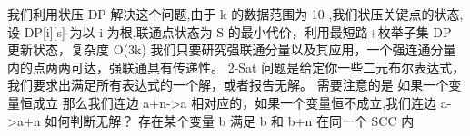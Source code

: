{}我们利用状压\markdownRendererDollarSign{} DP \markdownRendererDollarSign{}解决这个问题,由于\markdownRendererDollarSign{} k\markdownRendererSoftLineBreak
{}\markdownRendererDollarSign{}的数据范围为\markdownRendererDollarSign{} 10 \markdownRendererDollarSign{},我们状压关键点的状态,设\markdownRendererDollarSign{} DP[i][s] \markdownRendererDollarSign{}为以\markdownRendererDollarSign{} i\markdownRendererParagraphSeparator
{} \markdownRendererDollarSign{}为根,联通点状态为\markdownRendererDollarSign{} S\markdownRendererSoftLineBreak
{}\markdownRendererDollarSign{}的最小代价，利用最短路+枚举子集\markdownRendererDollarSign{} DP \markdownRendererDollarSign{}更新状态，复杂度\markdownRendererDollarSign{} O(3\markdownRendererCircumflex{}k) \markdownRendererDollarSign{}\markdownRendererInterblockSeparator
{}\markdownRendererInterblockSeparator
{}
\markdownRendererSectionEnd 
\markdownRendererSectionEnd \markdownRendererSectionBegin
{}\markdownRendererInterblockSeparator
{}\markdownRendererSectionBegin
{}\markdownRendererInterblockSeparator
{}我们只要研究强联通分量以及其应用，一个强连通分量内的点两两可达，强联通具有传递性。\markdownRendererInterblockSeparator
{}\markdownRendererSectionBegin
{}\markdownRendererInterblockSeparator
{}\markdownRendererInterblockSeparator
{}
\markdownRendererSectionEnd \markdownRendererSectionBegin
{}\markdownRendererInterblockSeparator
{}\markdownRendererDollarSign{} 2-Sat \markdownRendererDollarSign{}问题是给定你一些二元布尔表达式，我们要求出满足所有表达式的一个解，或者报告无解。\markdownRendererParagraphSeparator
{}需要注意的是 如果一个变量恒成立 那么我们连边\markdownRendererDollarSign{} a+n->a \markdownRendererDollarSign{}\markdownRendererParagraphSeparator
{}相对应的，如果一个变量恒不成立,我们连边 \markdownRendererDollarSign{} a->a+n \markdownRendererDollarSign{}\markdownRendererParagraphSeparator
{}如何判断无解？ 存在某个变量\markdownRendererDollarSign{} b \markdownRendererDollarSign{}满足\markdownRendererDollarSign{} b \markdownRendererDollarSign{}和\markdownRendererDollarSign{} b+n \markdownRendererDollarSign{}在同一个\markdownRendererDollarSign{} SCC \markdownRendererDollarSign{}内\markdownRendererParagraphSeparator
